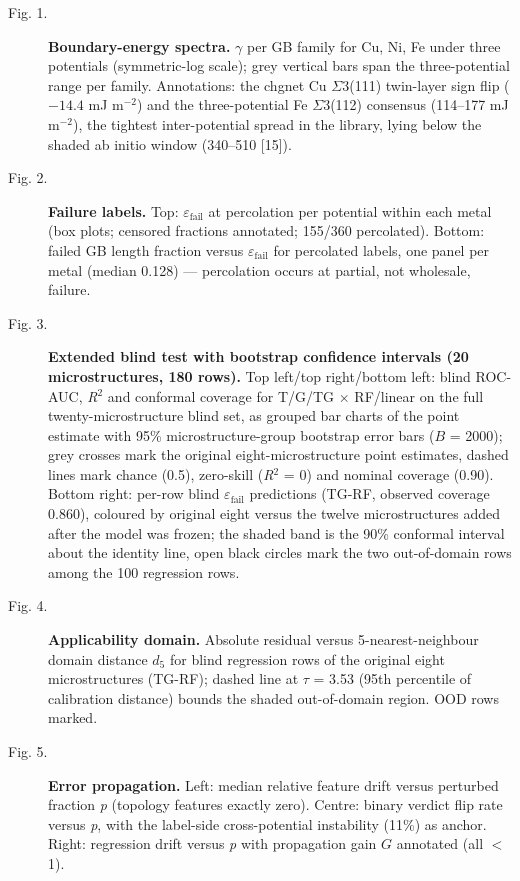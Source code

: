 \documentclass[12pt]{article}
\begin{document}
\begin{description}
\item[Fig. 1.] \textbf{Boundary-energy spectra.} $\gamma$ per GB family for Cu, Ni, Fe under three potentials (symmetric-log scale); grey vertical bars span the three-potential range per family. Annotations: the chgnet Cu $\Sigma$3(111) twin-layer sign flip ($-14.4$ mJ m$^{-2}$) and the three-potential Fe $\Sigma$3(112) consensus (114--177 mJ m$^{-2}$), the tightest inter-potential spread in the library, lying below the shaded ab initio window (340--510 [15]).
\item[Fig. 2.] \textbf{Failure labels.} Top: $\varepsilon_{\mathrm{fail}}$ at percolation per potential within each metal (box plots; censored fractions annotated; 155/360 percolated). Bottom: failed GB length fraction versus $\varepsilon_{\mathrm{fail}}$ for percolated labels, one panel per metal (median 0.128) --- percolation occurs at partial, not wholesale, failure.
\item[Fig. 3.] \textbf{Extended blind test with bootstrap confidence intervals (20 microstructures, 180 rows).} Top left/top right/bottom left: blind ROC-AUC, \textit{R}$^{2}$ and conformal coverage for T/G/TG $\times$ RF/linear on the full twenty-microstructure blind set, as grouped bar charts of the point estimate with 95\% microstructure-group bootstrap error bars ($B$ = 2000); grey crosses mark the original eight-microstructure point estimates, dashed lines mark chance (0.5), zero-skill (\textit{R}$^{2}$ = 0) and nominal coverage (0.90). Bottom right: per-row blind $\varepsilon_{\mathrm{fail}}$ predictions (TG-RF, observed coverage 0.860), coloured by original eight versus the twelve microstructures added after the model was frozen; the shaded band is the 90\% conformal interval about the identity line, open black circles mark the two out-of-domain rows among the 100 regression rows.
\item[Fig. 4.] \textbf{Applicability domain.} Absolute residual versus 5-nearest-neighbour domain distance $d_5$ for blind regression rows of the original eight microstructures (TG-RF); dashed line at $\tau$ = 3.53 (95th percentile of calibration distance) bounds the shaded out-of-domain region. OOD rows marked.
\item[Fig. 5.] \textbf{Error propagation.} Left: median relative feature drift versus perturbed fraction \textit{p} (topology features exactly zero). Centre: binary verdict flip rate versus \textit{p}, with the label-side cross-potential instability (11\%) as anchor. Right: regression drift versus \textit{p} with propagation gain $G$ annotated (all $<$ 1).
\end{description}
\end{document}

